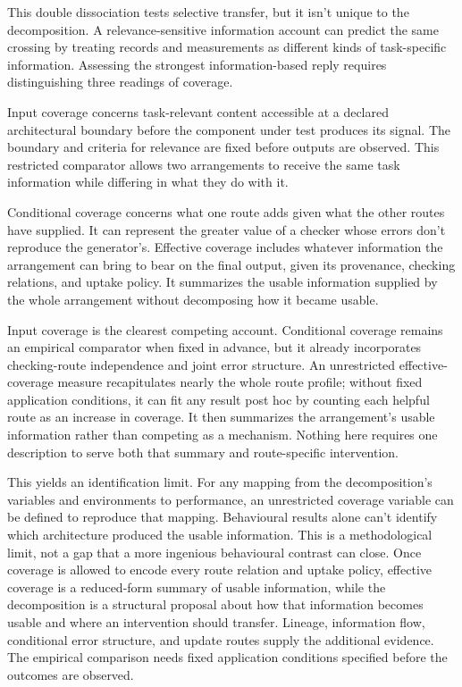 \documentclass[12pt]{article}
\begin{document}
This double dissociation tests selective transfer, but it isn't unique to the decomposition.
A relevance-sensitive information account can predict the same crossing by treating records
and measurements as different kinds of task-specific information. Assessing the strongest
information-based reply requires distinguishing three readings of coverage.

Input coverage concerns task-relevant content accessible at a declared architectural boundary
before the component under test produces its signal. The boundary and criteria for relevance
are fixed before outputs are observed. This restricted comparator allows two arrangements to
receive the same task information while differing in what they do with it.

Conditional coverage concerns what one route adds given what the other routes have
supplied. It can represent the greater value of a checker whose errors don't reproduce the
generator's. Effective coverage includes whatever information the arrangement can bring to
bear on the final output, given its provenance, checking relations, and uptake policy. It
summarizes the usable information supplied by the whole arrangement without decomposing how
it became usable.

Input coverage is the clearest competing account. Conditional coverage remains an empirical
comparator when fixed in advance, but it already incorporates checking-route independence and
joint error structure. An unrestricted effective-coverage measure recapitulates
nearly the whole route profile; without fixed
application conditions, it can fit any result post hoc by counting each helpful route as an
increase in coverage. It then summarizes the arrangement's usable information rather than
competing as a mechanism. Nothing here requires one description to serve both that summary
and route-specific intervention.

This yields an identification limit. For any mapping from the decomposition's variables and environments
to performance, an unrestricted coverage variable can be defined to reproduce that mapping.
Behavioural results alone can't identify which architecture produced the usable information.
This is a methodological limit, not a gap that a more ingenious behavioural contrast can
close. Once coverage is allowed to encode every route relation and uptake policy, effective
coverage is a reduced-form summary of usable information, while the decomposition is a
structural proposal about how that information becomes usable and where an intervention
should transfer.
Lineage, information flow, conditional error structure, and update routes supply the
additional evidence. The empirical comparison needs fixed application conditions specified
before the outcomes are observed.
\end{document}
